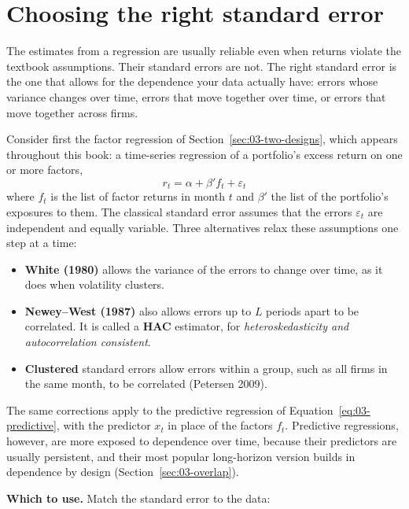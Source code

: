 \section{Choosing the right standard error}
\label{sec:03-se}

The estimates from a regression are usually reliable even when returns violate
the textbook assumptions. Their standard errors are not. The right standard
error is the one that allows for the dependence your data actually have: errors
whose variance changes over time, errors that move together over time, or
errors that move together across firms.

Consider first the factor regression of Section~\ref{sec:03-two-designs}, which
appears throughout this book: a time-series regression of a portfolio's excess
return on one or more factors,
\begin{equation}
  r_t = \alpha + \beta' f_t + \varepsilon_t
  \label{eq:03-ts}
\end{equation}
where $f_t$ is the list of factor returns in month $t$ and $\beta'$ the list of
the portfolio's exposures to them. The classical standard error assumes that
the errors $\varepsilon_t$ are independent and equally variable. Three
alternatives relax these assumptions one step at a time:

\begin{itemize}
  \item \textbf{White (1980)} allows the variance of the errors to change over
  time, as it does when volatility clusters.
  \item \textbf{Newey--West (1987)} also allows errors up to $L$ periods apart
  to be correlated. It is called a \textbf{HAC} estimator, for
  \emph{heteroskedasticity and autocorrelation consistent}.
  \item \textbf{Clustered} standard errors allow errors within a group, such as
  all firms in the same month, to be correlated (Petersen 2009).
\end{itemize}

The same corrections apply to the predictive regression of
Equation~\eqref{eq:03-predictive}, with the predictor $x_t$ in place of the
factors $f_t$. Predictive regressions, however, are more exposed to dependence
over time, because their predictors are usually persistent, and their most
popular long-horizon version builds in dependence by design
(Section~\ref{sec:03-overlap}).

\textbf{Which to use.} Match the standard error to the data:


